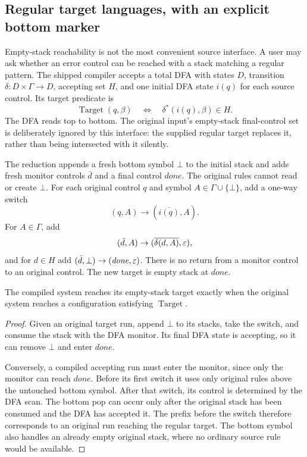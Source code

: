 \subsection{Regular target languages, with an explicit bottom marker}
Empty-stack reachability is not the most convenient source interface. A user
may ask whether an error control can be reached with a stack matching a regular
pattern. The shipped compiler accepts a total DFA with states $D$, transition
$\delta:D\times\Gamma\to D$, accepting set $H$, and one initial DFA state
$i(q)$ for each source control. Its target predicate is
\[
  \operatorname{Target}(q,\beta)
  \quad\Longleftrightarrow\quad
  \delta^*(i(q),\beta)\in H.
\]
The DFA reads top to bottom. The original input's empty-stack final-control set
is deliberately ignored by this interface: the supplied regular target replaces
it, rather than being intersected with it silently.

The reduction appends a fresh bottom symbol $\bot$ to the initial stack and
adds fresh monitor controls $\bar d$ and a final control $\mathit{done}$. The
original rules cannot read or create $\bot$. For each original control $q$ and
symbol $A\in\Gamma\cup\{\bot\}$, add a one-way switch
\[
 (q,A)\to(\overline{i(q)},A).
\]
For $A\in\Gamma$, add
\[
 (\bar d,A)\to(\overline{\delta(d,A)},\varepsilon),
\]
and for $d\in H$ add $(\bar d,\bot)\to(\mathit{done},\varepsilon)$. There is no
return from a monitor control to an original control. The new target is empty
stack at $\mathit{done}$.

\begin{theorem}
The compiled system reaches its empty-stack target exactly when the original
system reaches a configuration satisfying $\operatorname{Target}$.
\end{theorem}
\begin{proof}
Given an original target run, append $\bot$ to its stacks, take the switch, and
consume the stack with the DFA monitor. Its final DFA state is accepting, so it
can remove $\bot$ and enter $\mathit{done}$.

Conversely, a compiled accepting run must enter the monitor, since only the
monitor can reach $\mathit{done}$. Before its first switch it uses only original
rules above the untouched bottom symbol. After that switch, its control is
determined by the DFA scan. The bottom pop can occur only after the original
stack has been consumed and the DFA has accepted it. The prefix before the
switch therefore corresponds to an original run reaching the regular target.
The bottom symbol also handles an already empty original stack, where no
ordinary source rule would be available.
\end{proof}

